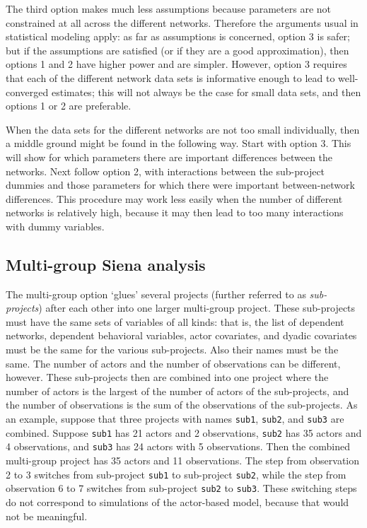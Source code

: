 \documentclass[a4paper,fleqn,11pt]{article}
\newcommand{\+}{\, + \,}
\begin{document}
The third option makes much less assumptions because parameters are not
constrained at all across the different networks.
Therefore the arguments usual in statistical modeling apply:
as far as assumptions is concerned, option 3 is safer;
but if the assumptions are satisfied (or if they are a good approximation),
then options 1 and 2 have higher power and are simpler.
However, option 3 requires that each of the different network data sets
is informative enough to lead to well-converged estimates;
this will not always be the case for small data sets,
and then options 1 or 2 are preferable.

When the data sets for the different networks are not too small
individually,
then a middle ground might be found in the following way.
Start with option 3. This will show for which parameters there are
important differences between the networks.
Next follow option 2, with interactions between the sub-project dummies
and those parameters for which there were important between-network
differences.
This procedure may work less easily when
the number of different networks is relatively high, because it may
then lead to too many interactions with dummy variables.

\subsection{Multi-group Siena analysis}
\label{S_multigroup}

The multi-group option `glues' several projects
(further referred to as \emph{sub-projects}) after each other
into one larger multi-group project.
These sub-projects
must have the same sets of variables of all kinds:
that is, the list of dependent networks, dependent behavioral variables,
actor covariates, and dyadic covariates must be the same
for the various sub-projects.
Also their names must be the same.
The number of actors
and the number of observations can be different, however.
These sub-projects then are combined into one project
where the number of actors is the largest of the number of
actors of the sub-projects, and the number of observations
is the sum of the observations of the sub-projects.
As an example, suppose that three projects with names {\tt sub1}, {\tt sub2},
and {\tt sub3} are combined. Suppose {\tt sub1} has 21 actors and
2 observations, {\tt sub2} has 35 actors and 4 observations,
and {\tt sub3} has 24 actors with 5 observations.
Then the combined multi-group project has 35 actors and 11 observations.
The step from observation 2 to 3 switches from sub-project {\tt sub1}
to sub-project {\tt sub2}, while
the step from observation 6 to 7 switches from sub-project {\tt sub2}
to {\tt sub3}. These switching steps do not correspond to simulations
of the actor-based model, because that would not be meaningful.
\end{document}
